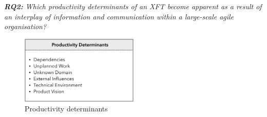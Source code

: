 \textit{\textbf{RQ2:} Which productivity determinants of an \ac{XFT} become apparent as a result of an interplay of information and communication within a large-scale agile organisation?}

\begin{figure}[h!]
  \centering
  \includegraphics[width=0.50\textwidth]{figures/productivity-determinants.png}
  \caption{Productivity determinants}
  \label{fig:productivity-determinants}
\end{figure}

